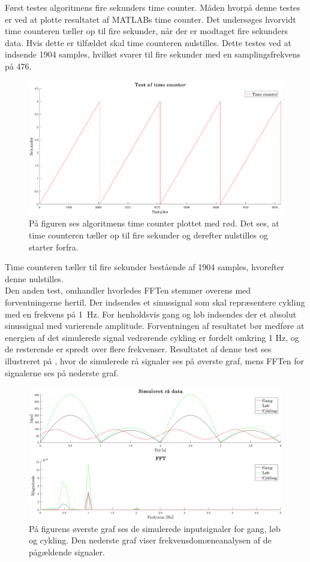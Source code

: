 Først testes algoritmens fire sekunders time counter. Måden hvorpå denne testes er ved at plotte resultatet af MATLABs time counter. Det undersøges hvorvidt time counteren tæller op til fire sekunder, når der er modtaget fire sekunders data. Hvis dette er tilfældet skal time counteren nulstilles. Dette testes ved at indsende 1904 samples, hvilket svarer til fire sekunder med en samplingsfrekvens på 476.  
\begin{figure}[H]
	\centering
	\includegraphics[width=.7\textwidth]{figures/cDesign/sim_counter.png}
	\caption{På figuren ses algoritmens time counter plottet med rød. Det ses, at time counteren tæller op til fire sekunder og derefter nulstilles og starter forfra.}
	\label{fig:sim_count}
\end{figure}\vspace{-.25cm}
Time counteren tæller til fire sekunder bestående af 1904 samples, hvorefter denne nulstilles.\\
Den anden test, omhandler hvorledes FFTen stemmer overens med forventningerne hertil. Der indsendes et sinussignal som skal repræsentere cykling med en frekvens på 1~Hz. For henholdsvis gang og løb indsendes der et absolut sinussignal med varierende amplitude. Forventningen af resultatet bør medføre at energien af det simulerede signal vedrørende cykling er fordelt omkring 1 Hz, og de resterende er spredt over flere frekvenser. Resultatet af denne test ses illustreret på , hvor de simulerede rå signaler ses på øverste graf, mens FFTen for signalerne ses på nederste graf.
\begin{figure}[H]
	\centering
	\includegraphics[width=.75\textwidth]{figures/cDesign/sim_gyro.png}
	\caption{På figurens øverste graf ses de simulerede inputsignaler for gang, løb og cykling. Den nederste graf viser frekvensdomæneanalysen af de pågældende signaler.}
	\label{fig:sim_gyro}
\end{figure}\vspace{-.25cm}
